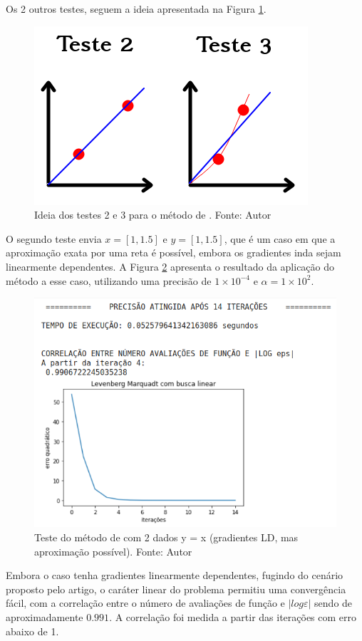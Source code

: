 \documentclass[11pt]{article}
\begin{document}
Os 2 outros testes, seguem a ideia apresentada na Figura \ref{t23}.
\begin{figure}[H]
\center
\includegraphics[scale=0.5]{Figuras/2testes.png}
\caption{Ideia dos testes 2 e 3 para o método de \cite{bmLS}. Fonte: Autor} 
\label{t23}
\end{figure}
O segundo teste envia $x = [1,1.5]$ e $y = [1,1.5]$, que é um caso em que a aproximação exata por uma reta é possível, embora os gradientes inda sejam linearmente dependentes. A Figura \ref{lmbl2} apresenta o resultado da aplicação do método a esse caso, utilizando uma precisão de $1\times10^{-4}$ e $\alpha = 1\times10^{2}$.
\begin{figure}[H]
\center
\includegraphics[scale=0.5]{Figuras/lmbl2.png}
\caption{Teste do método de \cite{bmLS} com 2 dados y = x (gradientes LD, mas aproximação possível). Fonte: Autor} 
\label{lmbl2}
\end{figure}

Embora o caso tenha gradientes linearmente dependentes, fugindo do cenário proposto pelo artigo, o caráter linear do problema permitiu uma convergência fácil, com a correlação entre o número de avaliações de função e $|log \varepsilon|$ sendo de aproximadamente $0.991$. A correlação foi medida a partir das iterações com erro abaixo de 1.
\end{document}
